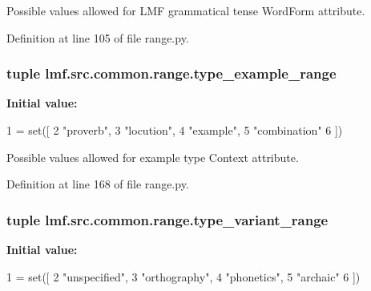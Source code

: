 Possible values allowed for L\+M\+F grammatical tense Word\+Form attribute. 



Definition at line 105 of file range.\+py.

\hypertarget{namespacelmf_1_1src_1_1common_1_1range_ac02d347b39dab64b3ce3604168d1b652}{
\subsubsection[{type\+\_\+example\+\_\+range}]{\setlength{\rightskip}{0pt plus 5cm}tuple lmf.\+src.\+common.\+range.\+type\+\_\+example\+\_\+range}}\label{namespacelmf_1_1src_1_1common_1_1range_ac02d347b39dab64b3ce3604168d1b652}
{\bfseries Initial value\+:}
\begin{DoxyCode}
1 = set([
2     \textcolor{stringliteral}{"proverb"},
3     \textcolor{stringliteral}{"locution"},
4     \textcolor{stringliteral}{"example"},
5     \textcolor{stringliteral}{"combination"}
6 ])
\end{DoxyCode}


Possible values allowed for example type Context attribute. 



Definition at line 168 of file range.\+py.

\hypertarget{namespacelmf_1_1src_1_1common_1_1range_a58f5cff733c3b357e42d3ce87c7080a0}{
\subsubsection[{type\+\_\+variant\+\_\+range}]{\setlength{\rightskip}{0pt plus 5cm}tuple lmf.\+src.\+common.\+range.\+type\+\_\+variant\+\_\+range}}\label{namespacelmf_1_1src_1_1common_1_1range_a58f5cff733c3b357e42d3ce87c7080a0}
{\bfseries Initial value\+:}
\begin{DoxyCode}
1 = set([
2     \textcolor{stringliteral}{"unspecified"},
3     \textcolor{stringliteral}{"orthography"},
4     \textcolor{stringliteral}{"phonetics"},
5     \textcolor{stringliteral}{"archaic"}
6 ])
\end{DoxyCode}



